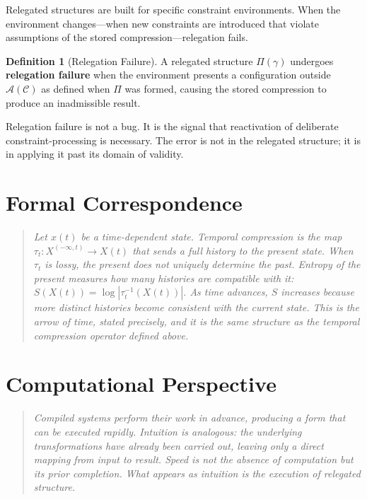 \documentclass[11pt]{book}
\theoremstyle{plain}
\theoremstyle{definition}
\newtheorem{definition}[theorem]{Definition}
\theoremstyle{remark}
\newcommand{\C}{\mathcal{C}}
\newcommand{\A}{\mathcal{A}}
\newenvironment{formalcorrespondence}
  {\begin{quote}\small\itshape}
  {\end{quote}}
\newenvironment{computationalaside}
  {\begin{quote}\small\itshape}
  {\end{quote}}
\begin{document}
Relegated structures are built for specific constraint environments. When
the environment changes---when new constraints are introduced that violate
assumptions of the stored compression---relegation fails.

\begin{definition}[Relegation Failure]
A relegated structure $\Pi(\gamma)$ undergoes \textbf{relegation failure}
when the environment presents a configuration outside $\A(\C)$ as defined
when $\Pi$ was formed, causing the stored compression to produce an
inadmissible result.
\end{definition}

Relegation failure is not a bug. It is the signal that reactivation of
deliberate constraint-processing is necessary. The error is not in the
relegated structure; it is in applying it past its domain of validity.

\section*{Formal Correspondence}
\begin{formalcorrespondence}
Let $x(t)$ be a time-dependent state. Temporal compression is the map
$\tau_t : X^{(-\infty,t)} \to X(t)$ that sends a full history to the
present state. When $\tau_t$ is lossy, the present does not uniquely
determine the past. Entropy of the present measures how many histories
are compatible with it: $S(X(t)) = \log|\tau_t^{-1}(X(t))|$. As time
advances, $S$ increases because more distinct histories become consistent
with the current state. This is the arrow of time, stated precisely, and
it is the same structure as the temporal compression operator defined
above.
\end{formalcorrespondence}

\section*{Computational Perspective}
\begin{computationalaside}
Compiled systems perform their work in advance, producing a form that can
be executed rapidly. Intuition is analogous: the underlying transformations
have already been carried out, leaving only a direct mapping from input to
result. Speed is not the absence of computation but its prior completion.
What appears as intuition is the execution of relegated structure.
\end{computationalaside}
\end{document}
